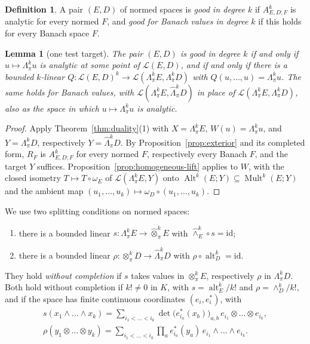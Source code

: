 \documentclass[11pt]{amsart}
\newtheorem{lemma}[theorem]{Lemma}
\theoremstyle{definition}
\newtheorem{definition}[theorem]{Definition}
\theoremstyle{remark}
\numberwithin{equation}{section}
\newcommand{\cL}{\mathcal L}
\newcommand{\Alt}{\operatorname{Alt}}
\newcommand{\Mult}{\operatorname{Mult}}
\newcommand{\id}{\mathrm{id}}
\theoremstyle{plain}
\theoremstyle{definition}
\theoremstyle{plain}
\begin{document}
\begin{definition}\label{fib:def:good}
A pair $(E,D)$ of normed spaces is \emph{good in degree $k$} if $A^k_{E,D;F}$ is analytic for every normed $F$, and
\emph{good for Banach values in degree $k$} if this holds for every Banach space $F$.
\end{definition}

\begin{lemma}[one test target]\label{fib:lem:test}
The pair $(E,D)$ is good in degree $k$ if and only if $u\mapsto\Lambda^k_\pi u$ is analytic at some point of $\cL(E,D)$,
and if and only if there is a bounded $k$\nobreakdash-linear $Q\colon\cL(E,D)^k\to\cL(\Lambda^k_\pi E,\Lambda^k_\pi D)$
with $Q(u,\dots,u)=\Lambda^k_\pi u$. The same holds for Banach values, with $\cL(\Lambda^k_\pi E,\widehat\Lambda^k_\pi D)$
in place of $\cL(\Lambda^k_\pi E,\Lambda^k_\pi D)$, also as the space in which $u\mapsto\Lambda^k_\pi u$ is analytic.
\end{lemma}

\begin{proof}
Apply Theorem~\ref{thm:duality}(1) with $X=\Lambda^k_\pi E$, $W(u)=\Lambda^k_\pi u$, and $Y=\Lambda^k_\pi D$,
respectively $Y=\widehat\Lambda^k_\pi D$. By Proposition~\ref{prop:exterior} and its completed form, $R_F$ is
$A^k_{E,D;F}$ for every normed $F$, respectively every Banach $F$, and the target $Y$ suffices. Proposition~\ref{prop:homogeneous-lift}
applies to $W$, with the closed isometry $T\mapsto T\circ\omega_E$ of $\cL(\Lambda^k_\pi E,Y)$ onto
$\Alt^k(E;Y)\subseteq\Mult^k(E;Y)$ and the ambient map $(u_1,\dots,u_k)\mapsto\omega_D\circ(u_1,\dots,u_k)$.
\end{proof}

We use two splitting conditions on normed spaces:
\begin{enumerate}
\item[$(\mathrm S^k_E)$] there is a bounded linear $s\colon\Lambda^k_\pi E\to\widehat\otimes^k_\pi E$ with
$\widehat\wedge^k_E\circ s=\id$;
\item[$(\mathrm R^k_D)$] there is a bounded linear $\rho\colon\otimes^k_\pi D\to\widehat\Lambda^k_\pi D$ with
$\rho\circ\operatorname{alt}^k_D=\id$.
\end{enumerate}
They hold \emph{without completion} if $s$ takes values in $\otimes^k_\pi E$, respectively $\rho$ in
$\Lambda^k_\pi D$. Both hold without completion if $k!\ne0$ in $K$, with $s=\operatorname{alt}^k_E/k!$ and
$\rho=\wedge^k_D/k!$, and if the space has finite continuous coordinates $(e_i,e^*_i)$, with
\[
 \begin{gathered}
 s(x_1\wedge\dots\wedge x_k)=\sum_{i_1<\dots<i_k}\det\bigl(e^*_{i_a}(x_b)\bigr)_{a,b}\,
 e_{i_1}\otimes\dots\otimes e_{i_k},\\
 \rho(y_1\otimes\dots\otimes y_k)=\sum_{i_1<\dots<i_k}\prod_a e^*_{i_a}(y_a)\,e_{i_1}\wedge\dots\wedge e_{i_k}.
 \end{gathered}
\]
\end{document}
